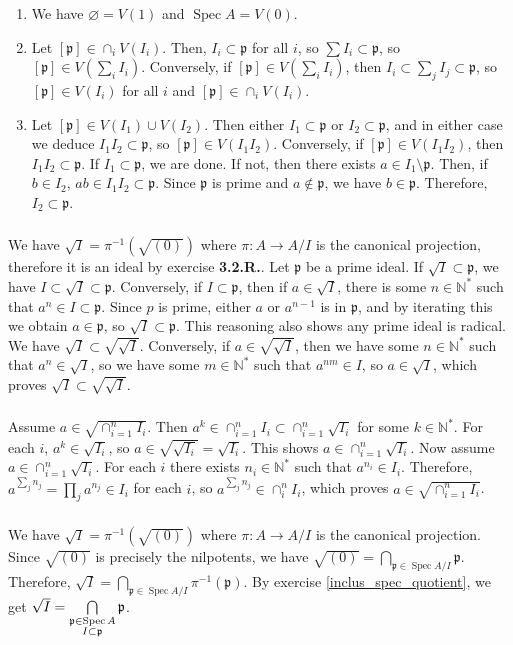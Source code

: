 \documentclass{article}
\newcommand{\N}{\mathbb{N}}
\DeclareMathOperator{\Spec}{Spec}
\newcommand{\p}{\mathfrak{p}}
\newcommand{\exercise}{\subsubsection} %
\begin{document}
\exercise{} \begin{enumerate}
    \item We have $\varnothing = V(1)$ and $\Spec A = V(0)$.
    \item Let $[\p] \in \cap_i V(I_i)$. Then, $I_i \subset \p$ for all $i$, so $\sum I_i \subset \p$, so $[\p] \in V(\sum_i I_i)$. Conversely, if $[\p] \in V(\sum_i I_i)$, then $I_i \subset \sum_j I_j \subset \p$, so $[\p] \in V(I_i)$ for all $i$ and $[\p] \in \cap_i V(I_i)$.
    \item Let $[\p] \in V(I_1) \cup V(I_2)$. Then either $I_1 \subset \p$ or $I_2 \subset \p$, and in either case we deduce $I_1 I_2 \subset \p$, so $[\p] \in V(I_1 I_2)$. Conversely, if $[\p] \in V(I_1 I_2)$, then $I_1 I_2 \subset \p$. If $I_1 \subset \p$, we are done. If not, then there exists $a \in I_1 \setminus \p$. Then, if $b \in I_2$, $ab \in I_1 I_2 \subset \p$. Since $\p$ is prime and $a \notin \p$, we have $b \in \p$. Therefore, $I_2 \subset \p$.
\end{enumerate}

\exercise{} We have $\sqrt{I} = \pi^{-1}(\sqrt{(0)})$ where $\pi : A \to A/I$ is the canonical projection, therefore it is an ideal by exercise \textbf{3.2.R.}. Let $\p$ be a prime ideal. If $\sqrt{I} \subset \p$, we have $I \subset \sqrt{I} \subset \p$. Conversely, if $I \subset \p$, then if $a \in \sqrt{I}$, there is some $n \in \N^*$ such that $a^n \in I \subset \p$. Since $p$ is prime, either $a$ or $a^{n-1}$ is in $\p$, and by iterating this we obtain $a \in \p$, so $\sqrt{I} \subset \p$. This reasoning also shows any prime ideal is radical. \\
We have $\sqrt{I} \subset \sqrt{\sqrt{I}}$. Conversely, if $a \in \sqrt{\sqrt{I}}$, then we have some $n \in \N^*$ such that $a^n \in \sqrt{I}$, so we have some $m \in \N^*$ such that $a^{nm} \in I$, so $a \in \sqrt{I}$, which proves $\sqrt{I} \subset \sqrt{\sqrt{I}}$.

\exercise{} Assume $a \in \sqrt{\cap_{i=1}^n I_i}$. Then $a^k \in \cap_{i=1}^n I_i \subset \cap_{i=1}^n \sqrt{I_i}$ for some $k \in \N^*$. For each $i$, $a^k \in \sqrt{I_i}$, so $a \in \sqrt{\sqrt{I_i}} = \sqrt{I_i}$. This shows $a \in \cap_{i=1}^n \sqrt{I_i}$. Now assume $a \in \cap_{i=1}^n \sqrt{I_i}$. For each $i$ there exists $n_i \in \N^*$ such that $a^{n_i} \in I_i$. Therefore, $a^{\sum_j n_j} = \prod_j a^{n_j} \in I_i$ for each $i$, so $a^{\sum_j n_j} \in \cap_i^n I_i$, which proves $a \in \sqrt{\cap_{i=1}^n I_i}$.

\exercise{} \label{intersection_prime_ideals}We have $\sqrt{I} = \pi^{-1}(\sqrt{(0)})$ where $\pi : A \to A/I$ is the canonical projection. Since $\sqrt{(0)}$ is precisely the nilpotents, we have $\sqrt{(0)} = \bigcap\limits_{\p \in \Spec A/I} \p$. Therefore, $\sqrt{I} = \bigcap\limits_{\p \in \Spec A/I} \pi^{-1}(\p)$. By exercise \ref{inclus_spec_quotient}, we get $\sqrt{I} = \bigcap\limits_{\begin{subarray}{c} \p \in \Spec A \\ I \subset \p \end{subarray}} \p$.
\end{document}
